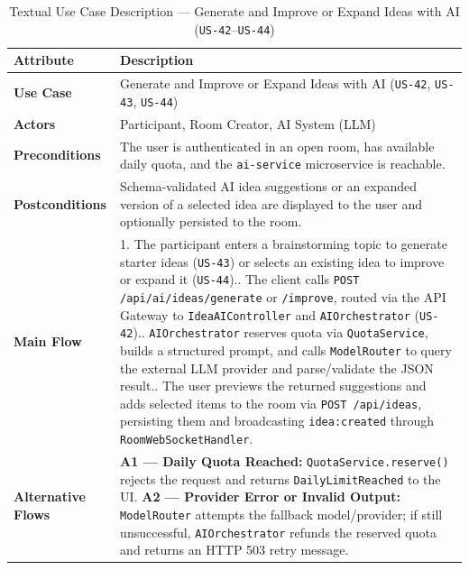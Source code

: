 \begin{table}[htbp]
\centering
\caption{Textual Use Case Description — Generate and Improve or Expand Ideas with AI (\texttt{US-42}--\texttt{US-44})}
\label{tab:uc-ai}
\small
\begin{tabularx}{\textwidth}{@{} l X @{}}
\toprule
\textbf{Attribute} & \textbf{Description} \\
\midrule
\textbf{Use Case} & Generate and Improve or Expand Ideas with AI (\texttt{US-42}, \texttt{US-43}, \texttt{US-44}) \\
\textbf{Actors} & Participant, Room Creator, AI System (LLM) \\
\textbf{Preconditions} & The user is authenticated in an open room, has available daily quota, and the \texttt{ai-service} microservice is reachable. \\
\textbf{Postconditions} & Schema-validated AI idea suggestions or an expanded version of a selected idea are displayed to the user and optionally persisted to the room. \\
\textbf{Main Flow} &
1. The participant enters a brainstorming topic to generate starter ideas (\texttt{US-43}) or selects an existing idea to improve or expand it (\texttt{US-44}).\newline
2. The client calls \texttt{POST /api/ai/ideas/generate} or \texttt{/improve}, routed via the API Gateway to \texttt{IdeaAIController} and \texttt{AIOrchestrator} (\texttt{US-42}).\newline
3. \texttt{AIOrchestrator} reserves quota via \texttt{QuotaService}, builds a structured prompt, and calls \texttt{ModelRouter} to query the external LLM provider and parse/validate the JSON result.\newline
4. The user previews the returned suggestions and adds selected items to the room via \texttt{POST /api/ideas}, persisting them and broadcasting \texttt{idea:created} through \texttt{RoomWebSocketHandler}. \\
\textbf{Alternative Flows} &
\textbf{A1 — Daily Quota Reached:} \texttt{QuotaService.reserve()} rejects the request and returns \texttt{DailyLimitReached} to the UI.\newline
\textbf{A2 — Provider Error or Invalid Output:} \texttt{ModelRouter} attempts the fallback model/provider; if still unsuccessful, \texttt{AIOrchestrator} refunds the reserved quota and returns an HTTP 503 retry message. \\
\bottomrule
\end{tabularx}
\end{table}

